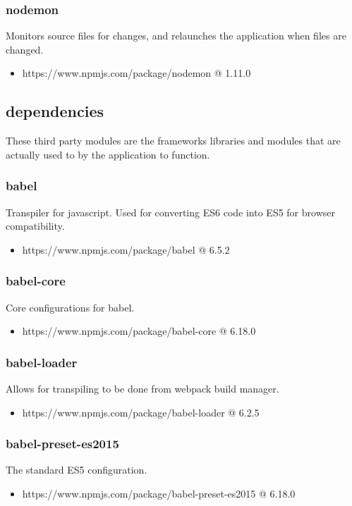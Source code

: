   \subsubsection{nodemon}
  Monitors source files for changes, and relaunches the application when files are changed.
  \begin{itemize}
    \item https://www.npmjs.com/package/nodemon @ 1.11.0
  \end{itemize}

\subsection{dependencies}
  These third party modules are the frameworks libraries and modules that are actually used to by the application to function. 

  \subsubsection{babel}
  Transpiler for javascript. Used for converting ES6 code into ES5 for browser compatibility.
  \begin{itemize}
    \item https://www.npmjs.com/package/babel @ 6.5.2
  \end{itemize}

  \subsubsection{babel-core}
  Core configurations for babel.
  \begin{itemize}
    \item https://www.npmjs.com/package/babel-core @ 6.18.0
  \end{itemize}

  \subsubsection{babel-loader}
  Allows for transpiling to be done from webpack build manager.
  \begin{itemize}
    \item https://www.npmjs.com/package/babel-loader @ 6.2.5
  \end{itemize}

  \subsubsection{babel-preset-es2015}
  The standard ES5 configuration.
  \begin{itemize}
    \item https://www.npmjs.com/package/babel-preset-es2015 @ 6.18.0
  \end{itemize}

